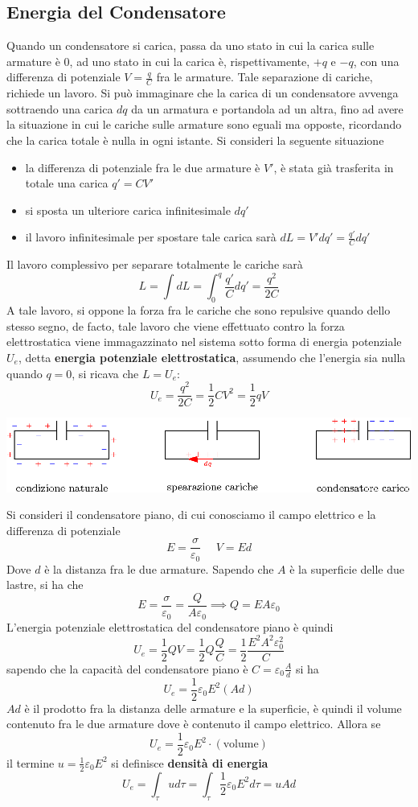 \documentclass[10pt, letterpaper]{report}
\begin{document}
\subsection{Energia del Condensatore}
Quando un condensatore si carica, passa da uno stato in cui la carica sulle armature è 0, ad uno stato in cui la carica è, rispettivamente, $+q$ e $-q$, con una differenza di potenziale $V=\frac{q}{C}$ fra le armature. Tale separazione di cariche, richiede un lavoro. Si può immaginare che la carica di un condensatore avvenga sottraendo una carica $dq$ da un armatura e portandola ad un altra, fino ad avere la situazione in cui le cariche sulle armature sono eguali ma opposte, ricordando che la carica totale è nulla in ogni istante.\acc 
Si consideri la seguente situazione \begin{itemize}
    \item la differenza di potenziale fra le due armature è $V'$, è stata già trasferita in totale una carica $q'=CV'$
    \item si sposta un ulteriore carica infinitesimale $dq'$
    \item il lavoro infinitesimale per spostare tale carica sarà $dL=V'dq'=\frac{q'}{C}dq'$
\end{itemize}
Il lavoro complessivo per separare totalmente le cariche sarà 
$$L=\int dL = \int_0^q \frac{q'}{C}dq'=\frac{q^2}{2C} $$
A tale lavoro, si oppone la forza fra le cariche che sono repulsive quando dello stesso segno, de facto, tale lavoro che viene effettuato contro la forza elettrostatica viene immagazzinato nel sistema sotto forma di energia potenziale $U_e$, detta \textbf{energia potenziale elettrostatica}, assumendo che l'energia sia nulla quando $q=0$, si ricava che $L=U_e$:
$$ U_e=\frac{q^2}{2C}=\frac{1}{2}CV^2=\frac{1}{2}qV$$
\begin{center}
    \includegraphics[width=\textwidth]{images/caricaCondensatore.eps}
\end{center} 
Si consideri il condensatore piano, di cui conosciamo il campo elettrico e la differenza di potenziale 
$$ E=\frac{\sigma}{\varepsilon_0} \ \ \ \ \ \ V=Ed$$
Dove $d$ è la distanza fra le due armature. Sapendo che $A$ è la superficie delle due lastre, si ha che 
$$ E=\frac{\sigma}{\varepsilon_0} = \frac{Q}{A\varepsilon_0}\implies Q=EA\varepsilon_0$$
L'energia potenziale elettrostatica del condensatore piano è quindi 
$$ U_e=\frac{1}{2}QV=\frac{1}{2}Q\frac{Q}{C}=\frac{1}{2}\frac{E^{2}A^2\varepsilon_0^2}{C}$$ sapendo che la capacità del condensatore piano è $C=\varepsilon_0\frac{A}{d}$ si ha 
$$ U_e=\frac{1}{2}\varepsilon_0E^{2}(Ad)$$ 
$Ad$ è il prodotto fra la distanza delle armature e la superficie, è quindi il volume contenuto fra le due armature dove è contenuto il campo elettrico. Allora se $$ U_e=\frac{1}{2}\varepsilon_0E^{2}\cdot (\text{volume})$$ 
il termine $u=\frac{1}{2}\varepsilon_0E^{2}$ si definisce \textbf{densità di energia}
$$ U_e=\int_\tau ud\tau = \int_\tau \frac{1}{2}\varepsilon_0E^2d\tau = uAd$$
\end{document}
